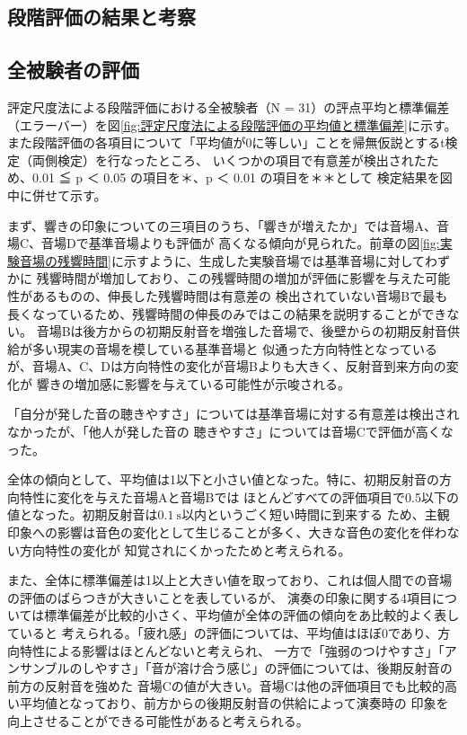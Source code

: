 \documentclass[11pt,a4j]{jreport}
\begin{document}
\subsection{段階評価の結果と考察}

\subsection*{全被験者の評価}
  評定尺度法による段階評価における全被験者（N = 31）の評点平均と標準偏差（エラーバー）を図\ref{fig:評定尺度法による段階評価の平均値と標準偏差}に示す。
  また段階評価の各項目について「平均値が0に等しい」ことを帰無仮説とするt検定（両側検定）を行なったところ、
  いくつかの項目で有意差が検出されたため、0.01 ≦ p ＜ 0.05 の項目を＊、p ＜ 0.01 の項目を＊＊として
  検定結果を図中に併せて示す。

  まず、響きの印象についての三項目のうち、「響きが増えたか」では音場A、音場C、音場Dで基準音場よりも評価が
  高くなる傾向が見られた。前章の図\ref{fig:実験音場の残響時間}に示すように、生成した実験音場では基準音場に対してわずかに
  残響時間が増加しており、この残響時間の増加が評価に影響を与えた可能性があるものの、伸長した残響時間は有意差の
  検出されていない音場Bで最も長くなっているため、残響時間の伸長のみではこの結果を説明することができない。
  音場Bは後方からの初期反射音を増強した音場で、後壁からの初期反射音供給が多い現実の音場を模している基準音場と
  似通った方向特性となっているが、音場A、C、Dは方向特性の変化が音場Bよりも大きく、反射音到来方向の変化が
  響きの増加感に影響を与えている可能性が示唆される。

  「自分が発した音の聴きやすさ」については基準音場に対する有意差は検出されなかったが、「他人が発した音の
  聴きやすさ」については音場Cで評価が高くなった。

  全体の傾向として、平均値は1以下と小さい値となった。特に、初期反射音の方向特性に変化を与えた音場Aと音場Bでは
  ほとんどすべての評価項目で0.5以下の値となった。初期反射音は$\SI{0.1}{\second}$以内というごく短い時間に到来する
  ため、主観印象への影響は音色の変化として生じることが多く、大きな音色の変化を伴わない方向特性の変化が
  知覚されにくかったためと考えられる。
  
  また、全体に標準偏差は1以上と大きい値を取っており、これは個人間での音場の評価のばらつきが大きいことを表しているが、
  演奏の印象に関する4項目については標準偏差が比較的小さく、平均値が全体の評価の傾向をあ比較的よく表していると
  考えられる。「疲れ感」の評価については、平均値はほぼ0であり、方向特性による影響はほとんどないと考えられ、
  一方で「強弱のつけやすさ」「アンサンブルのしやすさ」「音が溶け合う感じ」の評価については、後期反射音の前方の反射音を強めた
  音場Cの値が大きい。音場Cは他の評価項目でも比較的高い平均値となっており、前方からの後期反射音の供給によって演奏時の
  印象を向上させることができる可能性があると考えられる。
  
\end{document}

